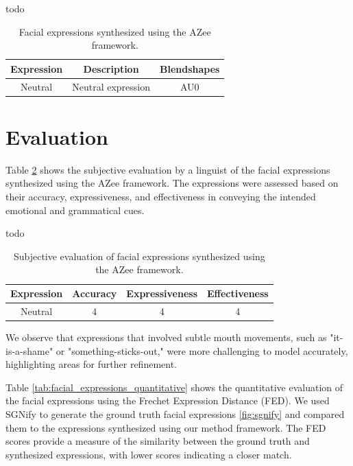 \documentclass[../../main.tex]{subfiles}
\begin{document}
todo
\begin{table}
    \centering
    \begin{tabular}{|c|c|c|}
        \hline
        \textbf{Expression} & \textbf{Description} & \textbf{Blendshapes} \\
        \hline
        Neutral & Neutral expression & AU0 \\
        
    \end{tabular}
    \caption{Facial expressions synthesized using the AZee framework.}
    \label{tab:facial_expressions}
\end{table}

\section{Evaluation}
\label{ch:facial_expressions:evaluation}

Table \ref{tab:facial_expressions_evaluation} shows the subjective evaluation by a linguist of the facial expressions synthesized using the AZee framework. The expressions were assessed based on their accuracy, expressiveness, and effectiveness in conveying the intended emotional and grammatical cues.

todo
\begin{table}
    \centering
    \begin{tabular}{|c|c|c|c|}
        \hline
        \textbf{Expression} & \textbf{Accuracy} & \textbf{Expressiveness} & \textbf{Effectiveness} \\
        \hline
        Neutral & 4 & 4 & 4 \\
        \hline
    \end{tabular}
    \caption{Subjective evaluation of facial expressions synthesized using the AZee framework.}
    \label{tab:facial_expressions_evaluation}
\end{table}

We observe that expressions that involved subtle mouth movements, such as "it-is-a-shame" or "something-sticks-out," were more challenging to model accurately, highlighting areas for further refinement.

Table \ref{tab:facial_expressions_quantitative} shows the quantitative evaluation of the facial expressions using the Frechet Expression Distance (FED). We used SGNify \cite{Forte_2023_CVPR} to generate the ground truth facial expressions \ref{fig:sgnify} and compared them to the expressions synthesized using our method framework. The FED scores provide a measure of the similarity between the ground truth and synthesized expressions, with lower scores indicating a closer match.
\end{document}
